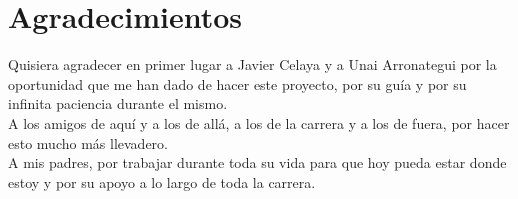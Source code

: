 \section{Agradecimientos}


Quisiera agradecer en primer lugar a Javier Celaya y a Unai Arronategui por la oportunidad que me han dado de hacer este proyecto, por su guía y por su infinita paciencia durante el mismo. \\

A los amigos de aquí y a los de allá, a los de la carrera y a los de fuera, por hacer esto mucho más llevadero. \\

A mis padres, por trabajar durante toda su vida para que hoy pueda estar donde estoy y por su apoyo a lo largo de toda la carrera. \\
